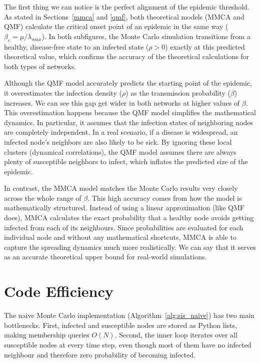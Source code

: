 \documentclass{article}
\begin{document}
The first thing we can notice is the perfect alignment of the epidemic threshold. As stated in Sections~\ref{mmca} and \ref{qmf}, both theoretical models (MMCA and QMF) calculate the critical onset point of an epidemic in the same way ($\beta_c = \mu / \lambda_{max}$). In both subfigures, the Monte Carlo simulation transitions from a healthy, disease-free state to an infected state ($\rho > 0$) exactly at this predicted theoretical value, which confirms the accuracy of the theoretical calculations for both types of networks.

Although the QMF model accurately predicts the starting point of the epidemic, it overestimates the infection density ($\rho$) as the transmission probability ($\beta$) increases. We can see this gap get wider in both networks at higher values of $\beta$. This overestimation happens because the QMF model simplifies the mathematical dynamics. In particular, it assumes that the infection states of neighboring nodes are completely independent. In a real scenario, if a disease is widespread, an infected node's neighbors are also likely to be sick. By ignoring these local clusters (dynamical correlations), the QMF model assumes there are always plenty of susceptible neighbors to infect, which inflates the predicted size of the epidemic.

In contrast, the MMCA model matches the Monte Carlo results very closely across the whole range of $\beta$. This high accuracy comes from how the model is mathematically structured. Instead of using a linear approximation (like QMF does), MMCA calculates the exact probability that a healthy node avoids getting infected from each of its neighbours. Since probabilities are evaluated for each individual node and without any mathematical shortcuts, MMCA is able to capture the spreading dynamics much more realistically. We can say that it serves as an accurate theoretical upper bound for real-world simulations.


\section{Code Efficiency}

The naive Monte Carlo implementation (Algorithm~\ref{alg:sis_naive}) has two main bottlenecks. First, infected and susceptible nodes are stored as Python lists, making membership queries $O(N)$. Second, the inner loop iterates over all susceptible nodes at every time step, even though most of them have no infected neighbour and therefore zero probability of becoming infected.
\end{document}
